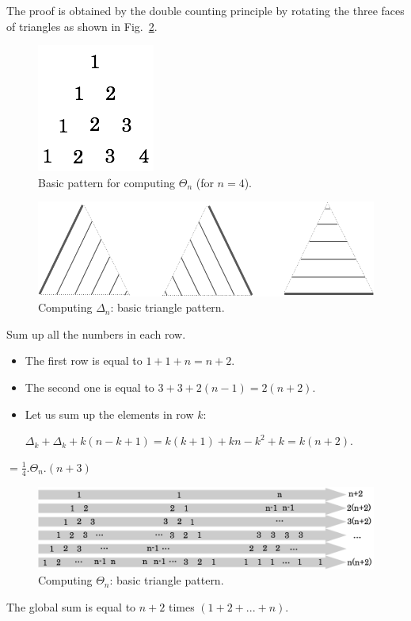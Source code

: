 The proof is obtained by the double counting principle by rotating the three faces of triangles as shown in Fig.~\ref{fig:Tetrahedral1}.
\begin{figure}[h]
\begin{center}
        \includegraphics[scale=0.4]{FiguresArithmetic/appTetrahedral3}
        \caption{Basic pattern for computing $\Theta_n$ (for $n=4$).}
        \label{fig:Tetrahedral3}
\end{center}
\end{figure}
\begin{figure}[h]
\begin{center}
        \includegraphics[scale=0.3]{FiguresArithmetic/appTetrahedral1}
        \caption{Computing $\Delta_n$: basic triangle pattern.}
        \label{fig:Tetrahedral1}
\end{center}
\end{figure}

Sum up all the numbers in each row.

\begin{itemize}
\item 
The first row is equal to $1+1+n = n+2$.
\item
The second one is equal to $3 + 3 + 2(n-1) = 2(n+2)$. 
\item
Let us sum up the elements in row $k$: 

$\Delta_k + \Delta_k + k(n-k+1)  = k(k+1) + kn-k^2+k = k(n+2)$.
\end{itemize}


$= \frac{1}{4}.\Theta_n.(n+3)$
\begin{figure}[h]
\begin{center}
        \includegraphics[scale=0.32]{FiguresArithmetic/appTetrahedral4}
        \caption{Computing $\Theta_n$: basic triangle pattern.}
        \label{fig:Tetrahedral4}
\end{center}
\end{figure}
The global sum is equal to $n+2$ times $(1+2+...+n)$.

